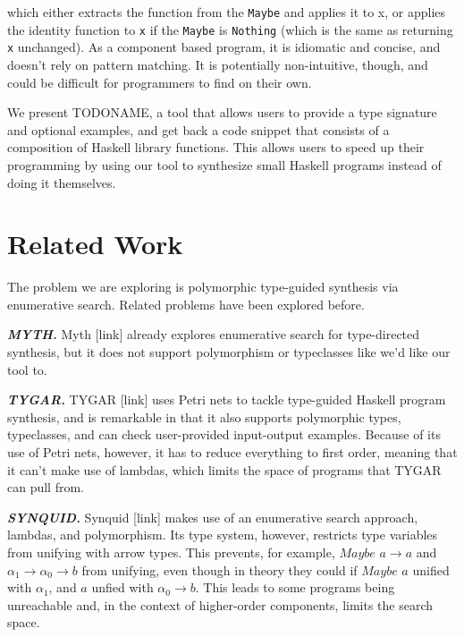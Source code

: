 \documentclass[acmsmall,nonacm]{acmart}
\begin{document}
\noindent which either extracts the function from the \verb|Maybe| and applies it to x, 
or applies the identity function to \verb|x| if the \verb|Maybe| is \verb|Nothing|
(which is the same as returning \verb|x| unchanged). As a component based program,
it is idiomatic and concise, and doesn't rely on pattern matching.  
It is potentially non-intuitive, though, and could be difficult 
for programmers to find on their own. 

We present TODONAME, a tool that allows users to provide a type signature and 
optional examples, and get back a code snippet 
that consists of a composition of Haskell library functions. This allows
users to speed up their programming by using our tool to synthesize small 
Haskell programs instead of doing it themselves. 




\section{Related Work}

The problem we are exploring is polymorphic type-guided synthesis via 
enumerative search. Related problems have been explored before. 

\vspace{2mm}
\noindent \textbf{\textit{MYTH.}} Myth [link] already explores enumerative search for 
type-directed synthesis, but it does not support polymorphism or typeclasses 
like we'd like our tool to. 

\vspace{2mm}
\noindent \textbf{\textit{TYGAR.}} TYGAR [link] uses Petri nets to 
tackle type-guided Haskell program synthesis, and is remarkable in that 
it also supports polymorphic types, typeclasses, and can check 
user-provided input-output examples. Because of its use of Petri nets, 
however, it has to reduce everything to first order, meaning that 
it can't make use of lambdas, which limits the space of programs that
TYGAR can pull from.

\vspace{2mm}
\noindent \textbf{\textit{SYNQUID.}} Synquid [link] makes 
use of an enumerative search approach, lambdas, and polymorphism. 
Its type system, however, restricts type variables
from unifying with arrow types. This prevents, for example, 
${Maybe}$ ${a \to a}$ 
and ${\alpha_1 \to \alpha_0 \to b}$ from unifying, even though in theory
they could if $Maybe$ $a$ unified with $\alpha_1$, and $a$ unfied 
with $\alpha_0 \to b$. This leads to some programs being unreachable
and, in the context of higher-order components, limits the search space. 
\end{document}
